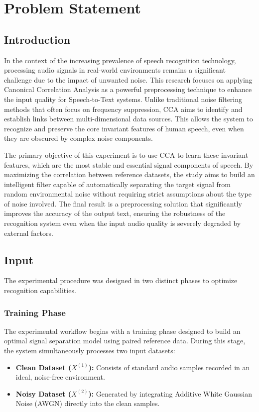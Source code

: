 \section{Problem Statement}

\subsection{Introduction}
In the context of the increasing prevalence of speech recognition technology, processing audio signals in real-world environments remains a significant challenge due to the impact of unwanted noise. This research focuses on applying Canonical Correlation Analysis as a powerful preprocessing technique to enhance the input quality for Speech-to-Text systems. Unlike traditional noise filtering methods that often focus on frequency suppression, CCA aims to identify and establish links between multi-dimensional data sources. This allows the system to recognize and preserve the core invariant features of human speech, even when they are obscured by complex noise components.

The primary objective of this experiment is to use CCA to learn these invariant features, which are the most stable and essential signal components of speech. By maximizing the correlation between reference datasets, the study aims to build an intelligent filter capable of automatically separating the target signal from random environmental noise without requiring strict assumptions about the type of noise involved. The final result is a preprocessing solution that significantly improves the accuracy of the output text, ensuring the robustness of the recognition system even when the input audio quality is severely degraded by external factors.

\subsection{Input}
The experimental procedure was designed in two distinct phases to optimize recognition capabilities.

\subsubsection{Training Phase}
The experimental workflow begins with a training phase designed to build an optimal signal separation model using paired reference data. During this stage, the system simultaneously processes two input datasets:
\begin{itemize}
    \item \textbf{Clean Dataset ($X^{(1)}$):} Consists of standard audio samples recorded in an ideal, noise-free environment.
    \item \textbf{Noisy Dataset ($X^{(2)}$):} Generated by integrating Additive White Gaussian Noise (AWGN) directly into the clean samples.
\end{itemize}

